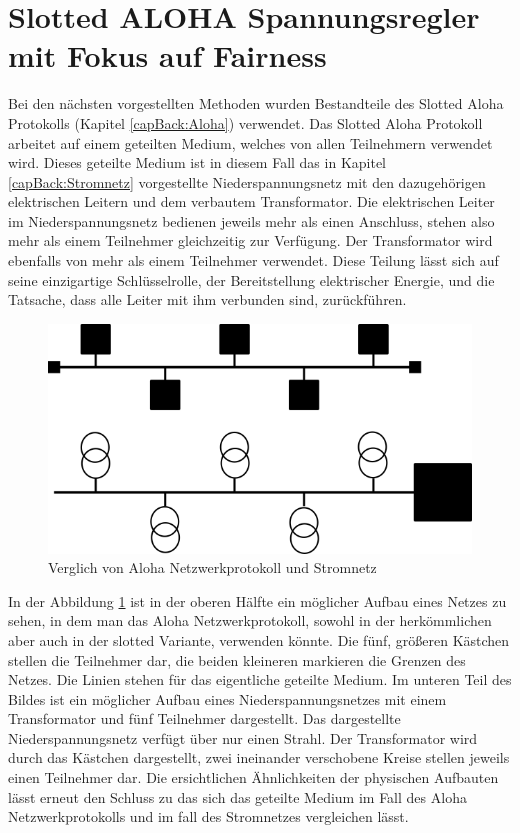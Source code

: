 \section{Slotted ALOHA Spannungsregler mit Fokus auf Fairness}
Bei den nächsten vorgestellten Methoden wurden Bestandteile des Slotted Aloha Protokolls (Kapitel \ref{capBack:Aloha}) verwendet. Das Slotted Aloha Protokoll arbeitet auf einem geteilten Medium, welches von allen Teilnehmern verwendet wird. Dieses geteilte Medium ist in diesem Fall das in Kapitel \ref{capBack:Stromnetz} vorgestellte Niederspannungsnetz mit den dazugehörigen elektrischen Leitern und dem verbautem Transformator. Die elektrischen Leiter im Niederspannungsnetz bedienen jeweils mehr als einen Anschluss, stehen also mehr als einem Teilnehmer gleichzeitig zur Verfügung. Der Transformator wird ebenfalls von mehr als einem Teilnehmer verwendet. Diese Teilung lässt sich auf seine einzigartige Schlüsselrolle, der Bereitstellung elektrischer Energie, und die Tatsache, dass alle Leiter mit ihm verbunden sind, zurückführen.\\
\begin{figure}[htb]
	\centering
	\includegraphics[scale=0.75]{img/sharedMedium.png}
	\caption{Verglich von Aloha Netzwerkprotokoll und Stromnetz}
	\label{Abb_sharedmedium}
\end{figure}
In der Abbildung \ref{Abb_sharedmedium} ist in der oberen Hälfte ein möglicher Aufbau eines Netzes zu sehen, in dem man das Aloha Netzwerkprotokoll, sowohl in der herkömmlichen aber auch in der slotted Variante, verwenden könnte. Die fünf, größeren Kästchen stellen die Teilnehmer dar, die beiden kleineren markieren die Grenzen des Netzes. Die Linien stehen für das eigentliche geteilte Medium. Im unteren Teil des Bildes ist ein möglicher Aufbau eines Niederspannungsnetzes mit einem Transformator und fünf Teilnehmer dargestellt. Das dargestellte Niederspannungsnetz verfügt über nur einen Strahl. Der Transformator wird durch das Kästchen dargestellt, zwei ineinander verschobene Kreise stellen jeweils einen Teilnehmer dar. Die ersichtlichen Ähnlichkeiten der physischen Aufbauten lässt erneut den Schluss zu das sich das geteilte Medium im Fall des Aloha Netzwerkprotokolls und im fall des Stromnetzes vergleichen lässt.\\
